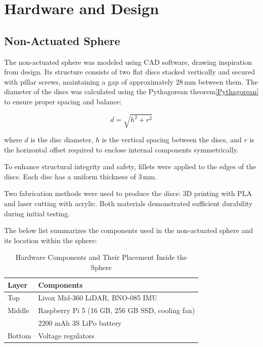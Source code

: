 \documentclass[conference]{IEEEtran}
\begin{document}
\section{Hardware and Design}

\subsection{Non-Actuated Sphere}

The non-actuated sphere was modeled using CAD software, drawing inspiration from \cite{Kalman_filter_sphere} design. Its structure consists of two flat discs stacked vertically and secured with pillar screws, maintaining a gap of approximately 28\,mm between them. The diameter of the discs was calculated using the Pythagorean theorem\eqref{Pythagorean} to ensure proper spacing and balance:

\begin{equation}
    d = \sqrt{h^2 + r^2} \label{Pythagorean}
\end{equation}


\noindent
where $d$ is the disc diameter, $h$ is the vertical spacing between the discs, and $r$ is the horizontal offset required to enclose internal components symmetrically.

To enhance structural integrity and safety, fillets were applied to the edges of the discs. Each disc has a uniform thickness of 3\,mm.

Two fabrication methods were used to produce the discs: 3D printing with PLA and laser cutting with acrylic. Both materials demonstrated sufficient durability during initial testing.

The below list summarizes the components used in the non-actuated sphere and its location within the sphere:



\begin{table}[H]
\centering
\caption{Hardware Components and Their Placement Inside the Sphere}
\label{tab:hardware_components}
\begin{tabularx}{\linewidth}{@{}l X@{}}
\toprule
\textbf{Layer} & \textbf{Components} \\
\midrule
Top    & Livox Mid-360 LiDAR, BNO-085 IMU \\
Middle & Raspberry Pi 5 (16 GB, 256 GB SSD, cooling fan) \\
       & 2200 mAh 3S LiPo battery \\
Bottom & Voltage regulators \\
\bottomrule
\end{tabularx}
\end{table}
\end{document}

